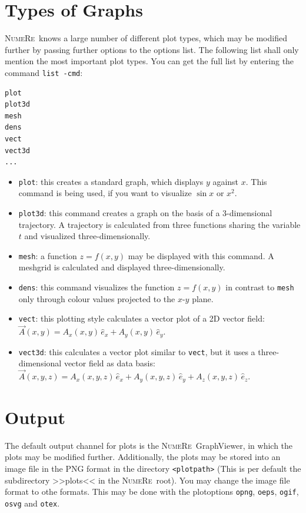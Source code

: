 \documentclass[DIV=14,headsepline,footsepline]{scrbook}
\newcommand{\NR}{\textsc{Nu\-me\-Re}}
\begin{document}
			\section{Types of Graphs}
				\NR\ knows a large number of different plot types, which may be modified further by passing further options to the options list. The following list shall only mention the most important plot types. You can get the full list by entering the command \verb+list -cmd+:
				\begin{lstlisting}
plot
plot3d
mesh
dens
vect
vect3d
...
				\end{lstlisting}
				\begin{itemize}
					\item \verb+plot+: this creates a standard graph, which displays $y$ against $x$. This command is being used, if you want to visualize $\sin x$ or $x^2$.
					\item \verb+plot3d+: this command creates a graph on the basis of a 3-dimensional trajectory. A trajectory is calculated from three functions sharing the variable $t$ and visualized three-dimensionally.
					\item \verb+mesh+: a function $z = f(x,y)$ may be displayed with this command. A meshgrid is calculated and displayed three-dimensionally.
					\item \verb+dens+: this command visualizes the function $z = f(x,y)$ in contrast to \verb+mesh+ only through colour values projected to the $x$-$y$ plane.
					\item \verb+vect+: this plotting style calculates a vector plot of a 2D vector field: $\vec A(x,y) = A_x(x,y)\,\hat e_x + A_y(x,y)\,\hat e_y$.
					\item \verb+vect3d+: this calculates a vector plot similar to \verb+vect+, but it uses a three-dimensional vector field as data basis: $\vec A(x,y,z) = A_x(x,y,z)\,\hat e_x + A_y(x,y,z)\,\hat e_y + A_z(x,y,z)\,\hat e_z$.
				\end{itemize}
			\section{Output}
				The default output channel for plots is the \NR\ GraphViewer, in which the plots may be modified further. Additionally, the plots may be stored into an image file in the PNG format in the directory \verb+<plotpath>+ (This is per default the subdirectory >>plots<< in the \NR\ root). You may change the image file format to othe formats. This may be done with the plotoptions \verb+opng+, \verb+oeps+, \verb+ogif+, \verb+osvg+ and \verb+otex+.
				
\end{document}
